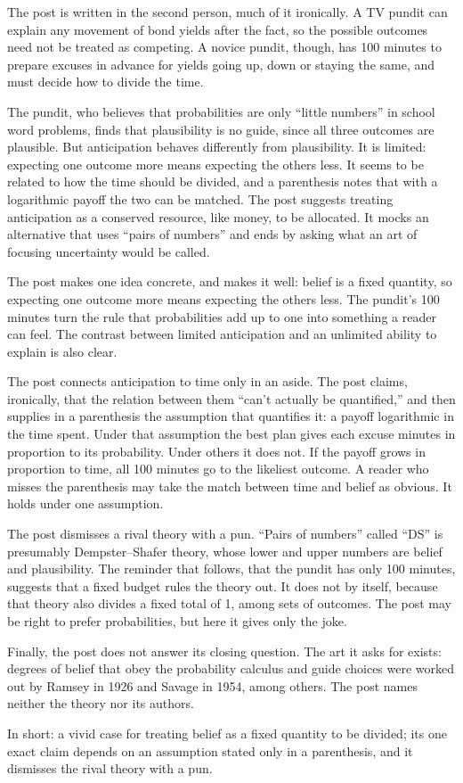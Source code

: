 \begin{afterword}
\summaryhead

The post is written in the second person, much of it ironically. A TV pundit can explain any movement of bond yields after the fact, so the possible outcomes need not be treated as competing. A novice pundit, though, has 100 minutes to prepare excuses in advance for yields going up, down or staying the same, and must decide how to divide the time.

The pundit, who believes that probabilities are only ``little numbers'' in school word problems, finds that plausibility is no guide, since all three outcomes are plausible. But anticipation behaves differently from plausibility. It is limited: expecting one outcome more means expecting the others less. It seems to be related to how the time should be divided, and a parenthesis notes that with a logarithmic payoff the two can be matched. The post suggests treating anticipation as a conserved resource, like money, to be allocated. It mocks an alternative that uses ``pairs of numbers'' and ends by asking what an art of focusing uncertainty would be called.

\responsehead

The post makes one idea concrete, and makes it well: belief is a fixed quantity, so expecting one outcome more means expecting the others less. The pundit's 100 minutes turn the rule that probabilities add up to one into something a reader can feel. The contrast between limited anticipation and an unlimited ability to explain is also clear.

The post connects anticipation to time only in an aside. The post claims, ironically, that the relation between them ``can't actually be quantified,'' and then supplies in a parenthesis the assumption that quantifies it: a payoff logarithmic in the time spent. Under that assumption the best plan gives each excuse minutes in proportion to its probability. Under others it does not. If the payoff grows in proportion to time, all 100 minutes go to the likeliest outcome. A reader who misses the parenthesis may take the match between time and belief as obvious. It holds under one assumption.

The post dismisses a rival theory with a pun. ``Pairs of numbers'' called ``DS'' is presumably Dempster--Shafer theory, whose lower and upper numbers are belief and plausibility. The reminder that follows, that the pundit has only 100 minutes, suggests that a fixed budget rules the theory out. It does not by itself, because that theory also divides a fixed total of 1, among sets of outcomes. The post may be right to prefer probabilities, but here it gives only the joke.

Finally, the post does not answer its closing question. The art it asks for exists: degrees of belief that obey the probability calculus and guide choices were worked out by Ramsey in 1926 and Savage in 1954, among others. The post names neither the theory nor its authors.

In short: a vivid case for treating belief as a fixed quantity to be divided; its one exact claim depends on an assumption stated only in a parenthesis, and it dismisses the rival theory with a pun.
\end{afterword}
